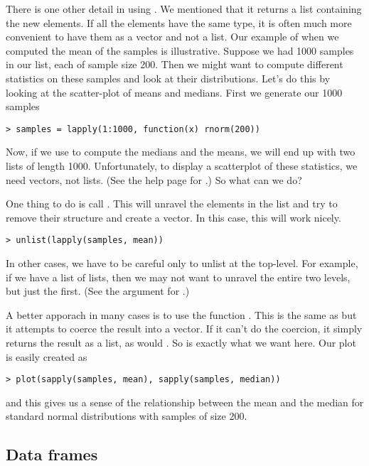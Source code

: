 There is one other detail in using . We mentioned
that it returns a list containing the new elements. If all the
elements have the same type, it is often much more convenient to have
them as a vector and not a list. Our example of when we computed the
mean of the samples is illustrative. Suppose we had 1000 samples in
our list, each of sample size 200. Then we might want to compute
different statistics on these samples and look at their
distributions. Let's do this by looking at the scatter-plot of means
and medians. First we generate our 1000 samples
\begin{verbatim}
> samples = lapply(1:1000, function(x) rnorm(200))
\end{verbatim}
Now, if we use  to compute the medians and the
means, we will end up with two lists of length 1000. Unfortunately, to
display a scatterplot of these statistics, we need vectors, not
lists. (See the help page for .) So what can we do?

One thing to do is call . This will unravel the
elements in the list and try to remove their structure and create a
vector. In this case, this will work nicely.
\begin{verbatim}
> unlist(lapply(samples, mean))
\end{verbatim}
In other cases, we have to be careful only to unlist at the
top-level. For example, if we have a list of lists, then we may not
want to unravel the entire two levels, but just the first. (See the
 argument for .)

A better apporach in many cases is to use the function
. This is the same as  but it
attempts to coerce the result into a vector. If it can't do the
coercion, it simply returns the result as a list, as would
. So  is exactly what we want
here. Our plot is easily created as
\begin{verbatim}
> plot(sapply(samples, mean), sapply(samples, median))
\end{verbatim}
and this gives us a sense of the relationship between the mean and
the median for standard normal distributions with samples of size
200.

\subsection{Data frames}


